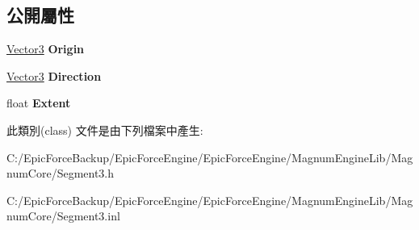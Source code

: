\subsection*{公開屬性}
\begin{DoxyCompactItemize}
\item 
\hyperlink{class_magnum_1_1_vector3}{Vector3} {\bfseries Origin}\hypertarget{class_magnum_1_1_segment3_a302e7137e5a93f4e3d0949d9832f7a44}{}\label{class_magnum_1_1_segment3_a302e7137e5a93f4e3d0949d9832f7a44}

\item 
\hyperlink{class_magnum_1_1_vector3}{Vector3} {\bfseries Direction}\hypertarget{class_magnum_1_1_segment3_a8ee0624f78180a000f018b0db33901b0}{}\label{class_magnum_1_1_segment3_a8ee0624f78180a000f018b0db33901b0}

\item 
float {\bfseries Extent}\hypertarget{class_magnum_1_1_segment3_a4831ad4a0e47e25acd162589ccf8c623}{}\label{class_magnum_1_1_segment3_a4831ad4a0e47e25acd162589ccf8c623}

\end{DoxyCompactItemize}


此類別(class) 文件是由下列檔案中產生\+:\begin{DoxyCompactItemize}
\item 
C\+:/\+Epic\+Force\+Backup/\+Epic\+Force\+Engine/\+Epic\+Force\+Engine/\+Magnum\+Engine\+Lib/\+Magnum\+Core/Segment3.\+h\item 
C\+:/\+Epic\+Force\+Backup/\+Epic\+Force\+Engine/\+Epic\+Force\+Engine/\+Magnum\+Engine\+Lib/\+Magnum\+Core/Segment3.\+inl\end{DoxyCompactItemize}

